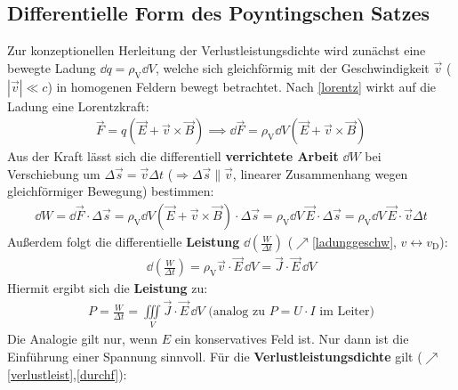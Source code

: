 \subsection{Differentielle Form des Poyntingschen Satzes}
Zur konzeptionellen Herleitung der Verlustleistungsdichte wird zunächst eine bewegte Ladung $\dd q = \rho_\text{V}\dd V$, welche sich gleichförmig mit der Geschwindigkeit $\vec{v}$ ($|\vec{v}| \ll c$) in homogenen Feldern bewegt betrachtet. Nach \ref{lorentz} wirkt auf die Ladung eine Lorentzkraft:
		        \begin{equation}\begin{split}
				        \vec{F} = q \left( \vec{E} + \vec{v} \times \vec{B} \right) \implies \dd\vec{F} = \rho_\text{V}\dd V \left( \vec{E} + \vec{v} \times \vec{B} \right)
			        \end{split}\end{equation}
Aus der Kraft lässt sich die differentiell \textbf{verrichtete Arbeit} $\dd W$ bei Verschiebung um $\Delta\vec{s} = \vec{v} \Delta t$ ($\Rightarrow\Delta\vec{s} \parallel \vec{v}$, linearer Zusammenhang wegen gleichförmiger Bewegung) bestimmen:
		        \begin{equation}\begin{split}
				        \dd W =  \dd\vec{F} \cdot \Delta\vec{s} = \rho_\text{V}\dd V \left( \vec{E} + \vec{v} \times \vec{B} \right)\cdot \Delta\vec{s}
				        = \rho_\text{V}\dd V\, \vec{E} \cdot \Delta\vec{s} = \rho_\text{V}\dd V\, \vec{E} \cdot \vec{v} \Delta t
			        \end{split}\end{equation}
Außerdem folgt die differentielle \textbf{Leistung} $\dd\left( \frac{W}{\Delta t}\right)$ ($\nearrow$\ref{ladunggeschw}, $v\leftrightarrow v_\text{D}$):
		        \begin{equation}\begin{split}
				        \dd\left( \frac{W}{\Delta t}\right) = \rho_\text{V}\vec{v}\cdot\vec{E}\, \dd V = \vec{J}\cdot\vec{E}\, \dd V
			        \end{split}\end{equation}
Hiermit ergibt sich die \textbf{Leistung} zu:
		        \begin{equation}\begin{split}
				        P = \frac{W}{\Delta t} = \iiint\limits_V \vec{J}\cdot\vec{E}\, \dd V \text{ (analog zu } P=U\cdot I \text{ im Leiter)}
			        \end{split}\end{equation}
Die Analogie gilt nur, wenn $E$ ein konservatives Feld ist. Nur dann ist die Einführung einer Spannung sinnvoll. Für die \textbf{Verlustleistungsdichte} gilt ($\nearrow$\ref{verlustleist},\ref{durchf}):
